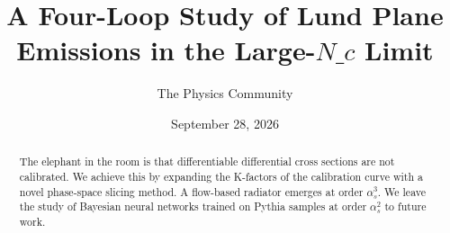 \documentclass[11pt]{article}
\title{A Four-Loop Study of Lund Plane Emissions in the Large-$N\_c$ Limit}
\author{The Physics Community}
\date{September 28, 2026}
\begin{document}
\maketitle
\begin{abstract}
The elephant in the room is that differentiable differential cross
sections are not calibrated. We achieve this by expanding the K-factors
of the calibration curve with a novel phase-space slicing method. A
flow-based radiator emerges at order $\alpha_s^3$. We leave the study of
Bayesian neural networks trained on Pythia samples at order $\alpha_s^2$
to future work.
\end{abstract}
\tableofcontents




\nocite{*}


\end{document}
